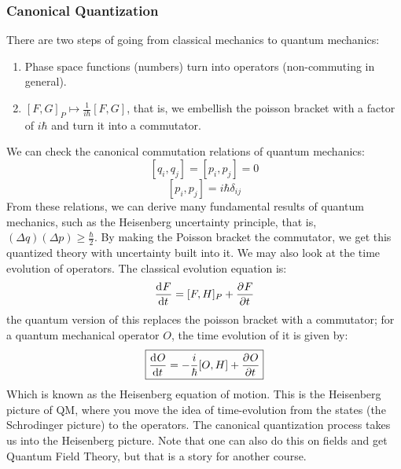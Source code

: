 \subsubsection{Canonical Quantization}
There are two steps of going from classical mechanics to quantum mechanics:
\begin{enumerate}
    \item Phase space functions (numbers) turn into operators (non-commuting in general).
    \item $[F, G]_P \mapsto \frac{1}{i \hbar}[F, G]$, that is, we embellish the poisson bracket with a factor of $i\hbar$ and turn it into a commutator.
\end{enumerate}
We can check the canonical commutation relations of quantum mechanics:
\[[q_i, q_j] = [p_i, p_j] = 0\]
\[[p_i, p_j] = i\hbar\delta_{ij}\]
From these relations, we can derive many fundamental results of quantum mechanics, such as the Heisenberg uncertainty principle, that is, $(\Delta q)(\Delta p) \geq \frac{\hbar}{2}$. By making the Poisson bracket the commutator, we get this quantized theory with uncertainty built into it. We may also look at the time evolution of operators. The classical evolution equation is:
\[\dod{F}{t} = [F, H]_P + \dpd{F}{t}\]
the quantum version of this replaces the poisson bracket with a commutator; for a quantum mechanical operator $O$, the time evolution of it is given by:
\[\boxed{\dod{O}{t} = -\frac{i}{\hbar}[O, H] + \dpd{O}{t}}\]
Which is known as the Heisenberg equation of motion. This is the Heisenberg picture of QM, where you move the idea of time-evolution from the states (the Schrodinger picture) to the operators. The canonical quantization process takes us into the Heisenberg picture. Note that one can also do this on fields and get Quantum Field Theory, but that is a story for another course.
